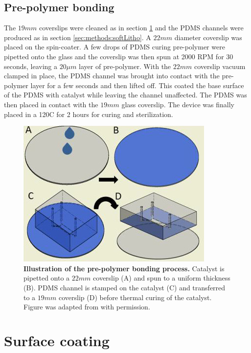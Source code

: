         \subsection{Pre-polymer bonding}
        The \(19mm\) coverslips were cleaned as in section \ref{sec:methods:surface} and the PDMS channels were produced as in section \ref{sec:methods:softLitho}. A \(22mm\) diameter coverslip was placed on the spin-coater. A few drops of PDMS curing pre-polymer were pipetted onto the glass and the coverslip was then spun at 2000 RPM for 30 seconds, leaving a \(20\mu m\) layer of pre-polymer. With the \(22mm\) coverslip vacuum clamped in place, the PDMS channel was brought into contact with the pre-polymer layer for a few seconds and then lifted off. This coated the base surface of the PDMS with catalyst while leaving the channel unaffected. The PDMS was then placed in contact with the \(19mm\) glass coverslip. The device was finally placed in a 120\degree C for 2 hours for curing and sterilization.


        \begin{figure}[h]
            \centering
            \includegraphics[scale=0.7]{chapter2/figures/glueBonding/glueBonding.jpg}
            \caption[Illustration of the pre-polymer bonding process]{\textbf{Illustration of the pre-polymer bonding process.}  Catalyst is pipetted onto a \(22mm\) coverslip (A) and spun to a uniform thickness (B). PDMS channel is stamped on the catalyst (C) and transferred to a \(19mm\) coverslip (D) before thermal curing of the catalyst. Figure was adapted from \cite{johnstoneThesis} with permission.}
            \label{fig:methods:glueBonding}
        \end{figure}


    \section{Surface coating}
    \label{sec:methods:surface}
